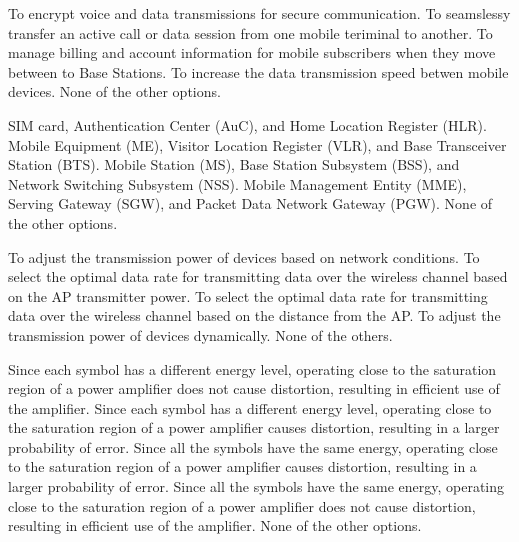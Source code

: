 \begin{questions}

    \begin{checkboxes}
        \choice To encrypt voice and data transmissions for secure communication.
        \choice To seamslessy transfer an active call or data session from one mobile teriminal to another.
        \choice To manage billing and account information for mobile subscribers when they move between to Base Stations.
        \choice To increase the data transmission speed betwen mobile devices.
        \CorrectChoice None of the other options.
    \end{checkboxes}

    \begin{checkboxes}
        \CorrectChoice SIM card, Authentication Center (AuC), and Home Location Register (HLR).
        \choice Mobile Equipment (ME), Visitor Location Register (VLR), and Base Transceiver Station (BTS).
        \choice Mobile Station (MS), Base Station Subsystem (BSS), and Network Switching Subsystem (NSS).
        \choice Mobile Management Entity (MME), Serving Gateway (SGW), and Packet Data Network Gateway (PGW).
        \choice None of the other options.
    \end{checkboxes}

    \begin{checkboxes}
        \choice To adjust the transmission power of devices based on network conditions.
        \choice To select the optimal data rate for transmitting data over the wireless channel based on the AP transmitter power.
        \choice To select the optimal data rate for transmitting data over the wireless channel based on the distance from the AP.
        \choice To adjust the transmission power of devices dynamically.
        \CorrectChoice None of the others.
    \end{checkboxes}

    \begin{checkboxes}
        \choice Since each symbol has a different energy level, operating close to the saturation region of a power amplifier does not cause distortion, resulting in efficient use of the amplifier.
        \choice Since each symbol has a different energy level, operating close to the saturation region of a power amplifier causes distortion, resulting in a larger probability of error.
        \choice Since all the symbols have the same energy, operating close to the saturation region of a power amplifier causes distortion, resulting in a larger probability of error.
        \CorrectChoice Since all the symbols have the same energy, operating close to the saturation region of a power amplifier does not cause distortion, resulting in efficient use of the amplifier.
        \choice None of the other options.
    \end{checkboxes}



\end{questions}

